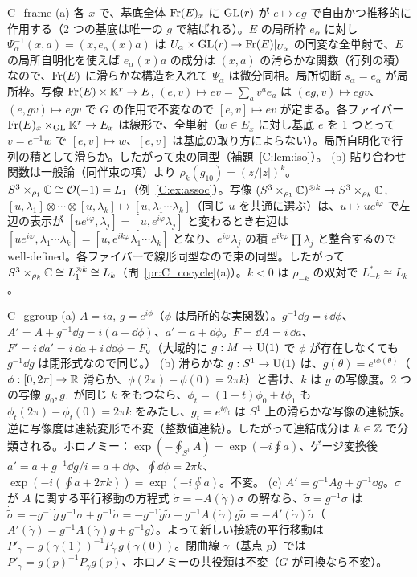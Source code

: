 \begin{soll}{C_frame}
(a) 各 $x$ で、基底全体 $\operatorname{Fr}(E)_x$ に $\mathrm{GL}(r)$ が $e\mapsto eg$ で自由かつ推移的に作用する（2 つの基底は唯一の $g$ で結ばれる）。$E$ の局所枠 $e_\alpha$ に対し $\Psi_\alpha^{-1}(x,a)=(x,e_\alpha(x)a)$ は $U_\alpha\times\mathrm{GL}(r)\to\operatorname{Fr}(E)|_{U_\alpha}$ の同変な全単射で、$E$ の局所自明化を使えば $e_\alpha(x)a$ の成分は $(x,a)$ の滑らかな関数（行列の積）なので、$\operatorname{Fr}(E)$ に滑らかな構造を入れて $\Psi_\alpha$ は微分同相。局所切断 $s_\alpha=e_\alpha$ が局所枠。写像 $\operatorname{Fr}(E)\times\mathbb K^r\to E$, $(e,v)\mapsto ev=\sum_av^ae_a$ は $(eg,v)\mapsto egv$、$(e,gv)\mapsto egv$ で $G$ の作用で不変なので $[e,v]\mapsto ev$ が定まる。各ファイバー $\operatorname{Fr}(E)_x\times_{\mathrm{GL}}\mathbb K^r\to E_x$ は線形で、全単射（$w\in E_x$ に対し基底 $e$ を 1 つとって $v=e^{-1}w$ で $[e,v]\mapsto w$、$[e,v]$ は基底の取り方によらない）。局所自明化で行列の積として滑らか。したがって束の同型（補題~\ref{C:lem:iso}）。
(b) 貼り合わせ関数は一般論（同伴束の項）より $\rho_k(g_{10})=(z/|z|)^k$。$S^3\times_{\rho_1}\mathbb C\cong\mathcal O(-1)=L_1$（例~\ref{C:ex:assoc}）。写像 $(S^3\times_{\rho_1}\mathbb C)^{\otimes k}\to S^3\times_{\rho_k}\mathbb C$, $[u,\lambda_1]\otimes\cdots\otimes[u,\lambda_k]\mapsto[u,\lambda_1\cdots\lambda_k]$（同じ $u$ を共通に選ぶ）は、$u\mapsto ue^{i\varphi}$ で左辺の表示が $[ue^{i\varphi},\lambda_j]=[u,e^{i\varphi}\lambda_j]$ と変わるとき右辺は $[ue^{i\varphi},\lambda_1\cdots\lambda_k]=[u,e^{ik\varphi}\lambda_1\cdots\lambda_k]$ となり、$e^{i\varphi}\lambda_j$ の積 $e^{ik\varphi}\prod\lambda_j$ と整合するので well-defined。各ファイバーで線形同型なので束の同型。したがって $S^3\times_{\rho_k}\mathbb C\cong L_1^{\otimes k}\cong L_k$（問~\ref{pr:C_cocycle}(a)）。$k<0$ は $\rho_{-k}$ の双対で $L_{-k}^*\cong L_k$。
\end{soll}

\begin{soll}{C_ggroup}
(a) $A=ia$, $g=e^{i\phi}$（$\phi$ は局所的な実関数）。$g^{-1}\dd g=i\,\dd\phi$、$A'=A+g^{-1}\dd g=i(a+\dd\phi)$、$a'=a+\dd\phi$。$F=\dd A=i\,\dd a$、$F'=i\,\dd a'=i\,\dd a+i\,\dd\dd\phi=F$。（大域的に $g:M\to\mathrm{U}(1)$ で $\phi$ が存在しなくても $g^{-1}\dd g$ は閉形式なので同じ。）
(b) 滑らかな $g:S^1\to\mathrm{U}(1)$ は、$g(\theta)=e^{i\phi(\theta)}$（$\phi:[0,2\pi]\to\mathbb R$ 滑らか、$\phi(2\pi)-\phi(0)=2\pi k$）と書け、$k$ は $g$ の写像度。2 つの写像 $g_0,g_1$ が同じ $k$ をもつなら、$\phi_t=(1-t)\phi_0+t\phi_1$ も $\phi_t(2\pi)-\phi_t(0)=2\pi k$ をみたし、$g_t=e^{i\phi_t}$ は $S^1$ 上の滑らかな写像の連続族。逆に写像度は連続変形で不変（整数値連続）。したがって連結成分は $k\in\mathbb Z$ で分類される。ホロノミー：$\exp(-\oint_{S^1}A)=\exp(-i\oint a)$、ゲージ変換後 $a'=a+g^{-1}\dd g/i=a+\dd\phi$、$\oint\dd\phi=2\pi k$、$\exp(-i(\oint a+2\pi k))=\exp(-i\oint a)$。不変。
(c) $A'=g^{-1}Ag+g^{-1}\dd g$。$\sigma$ が $A$ に関する平行移動の方程式 $\dot\sigma=-A(\dot\gamma)\sigma$ の解なら、$\tilde\sigma=g^{-1}\sigma$ は $\dot{\tilde\sigma}=-g^{-1}\dot g\,g^{-1}\sigma+g^{-1}\dot\sigma=-g^{-1}\dot g\tilde\sigma-g^{-1}A(\dot\gamma)g\tilde\sigma=-A'(\dot\gamma)\tilde\sigma$（$A'(\dot\gamma)=g^{-1}A(\dot\gamma)g+g^{-1}\dot g$）。よって新しい接続の平行移動は $P'_\gamma=g(\gamma(1))^{-1}P_\gamma\,g(\gamma(0))$。閉曲線 $\gamma$（基点 $p$）では $P'_\gamma=g(p)^{-1}P_\gamma g(p)$、ホロノミーの共役類は不変（$G$ が可換なら不変）。
\end{soll}

